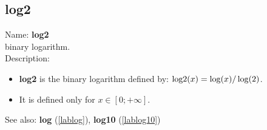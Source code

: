 \subsection{log2}
\label{lablog2}
\noindent Name: \textbf{log2}\\
binary logarithm.\\

\noindent Description: \begin{itemize}

\item \textbf{log2} is the binary logarithm defined by: ${\rm log2}(x) = \log(x)/\log(2)$.

\item It is defined only for $x \in [0; +\infty]$.
\end{itemize}
See also: \textbf{log} (\ref{lablog}), \textbf{log10} (\ref{lablog10})
